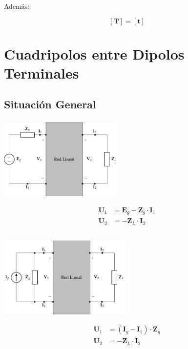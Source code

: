 Además:

\[
  \boxed{[\mathbf{T}] = [\mathbf{t}]}
\]


\section{Cuadripolos entre Dipolos Terminales}
\label{sec:org4eb70ca}

\subsection{Situación General}
\label{sec:orgf52f6e2}
\subsubsection{}
\label{sec:org495ece7}

\includegraphics[height=4cm]{../figs/cuadripolo_cargado_fuente_tension.pdf}


\begin{align*}
  \mathbf{U}_1 &= \mathbf{E}_g - \mathbf{Z}_g \cdot \mathbf{I}_1\\
  \mathbf{U}_2 &= - \mathbf{Z}_L \cdot \mathbf{I}_2\\
\end{align*}

\subsubsection{}
\label{sec:orgc9420fa}

\includegraphics[height=4cm]{../figs/cuadripolo_cargado_fuente_corriente.pdf}


\begin{align*}
  \mathbf{U}_1 &= (\mathbf{I}_g - \mathbf{I}_1) \cdot \mathbf{Z}_g\\
  \mathbf{U}_2 &= - \mathbf{Z}_L \cdot \mathbf{I}_2\\
\end{align*}


